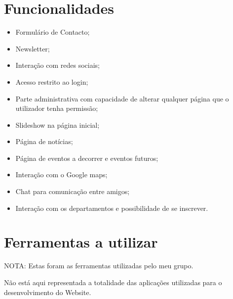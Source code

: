 \documentclass[11pt]{report}
\begin{document}
\section{Funcionalidades}
\begin{itemize}
\item Formulário de Contacto;
\item Newsletter;
\item Interação com redes sociais;
\item Acesso restrito ao login;
\item Parte administrativa com capacidade de alterar qualquer página que o utilizador tenha permissão;
\item Slideshow na página inicial;
\item Página de notícias;
\item Página de eventos a decorrer e eventos futuros;
\item Interação com o Google maps;
\item Chat para comunicação entre amigos;
\item Interação com os departamentos e possibilidade de se inscrever.
\end{itemize}
\newpage
\section{Ferramentas a utilizar}

\linebreak

NOTA: Estas foram as ferramentas utilizadas pelo meu grupo.

 Não está aqui representada a totalidade das aplicações utilizadas para o desenvolvimento do Website.
\bigskip
\linebreak

\linebreak

\linebreak
\end{document}
